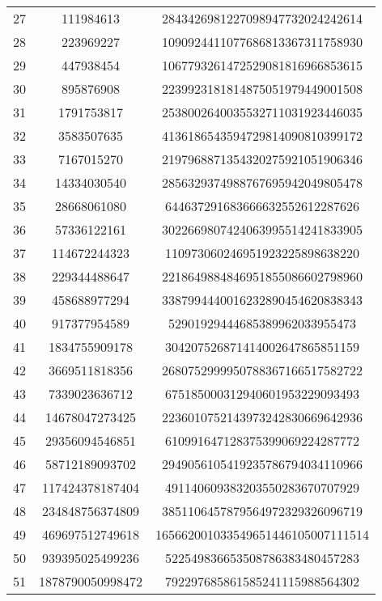 \documentclass[fleqn]{article}
\begin{document}
\begin{center}
\begin{tabular}{c | c | c}
            27 & 111984613 & 2843426981227098947732024242614 \\
            28 & 223969227 & 1090924411077686813367311758930 \\
            29 & 447938454 & 1067793261472529081816966853615 \\
            30 & 895876908 & 2239923181814875051979449001508 \\
            31 & 1791753817 & 2538002640035532711031923446035 \\
            32 & 3583507635 & 4136186543594729814090810399172 \\
            33 & 7167015270 & 2197968871354320275921051906346 \\
            34 & 14334030540 & 2856329374988767695942049805478 \\
            35 & 28668061080 & 644637291683666632552612287626 \\
            36 & 57336122161 & 3022669807424063995514241833905 \\
            37 & 114672244323 & 110973060246951923225898638220 \\
            38 & 229344488647 & 2218649884846951855086602798960 \\
            39 & 458688977294 & 3387994440016232890454620838343 \\
            40 & 917377954589 & 52901929444685389962033955473 \\
            41 & 1834755909178 & 304207526871414002647865851159 \\
            42 & 3669511818356 & 2680752999950788367166517582722 \\
            43 & 7339023636712 & 675185000312940601953229093493 \\
            44 & 14678047273425 & 2236010752143973242830669642936 \\
            45 & 29356094546851 & 610991647128375399069224287772 \\
            46 & 58712189093702 & 2949056105419235786794034110966 \\
            47 & 117424378187404 & 491140609383203550283670707929 \\
            48 & 234848756374809 & 3851106457879564972329326096719 \\
            49 & 469697512749618 & 165662001033549651446105007111514 \\
            50 & 939395025499236 & 522549836653508786383480457283 \\
            51 & 1878790050998472 & 792297685861585241115988564302 \\

\end{tabular}
\end{center}
\end{document}
